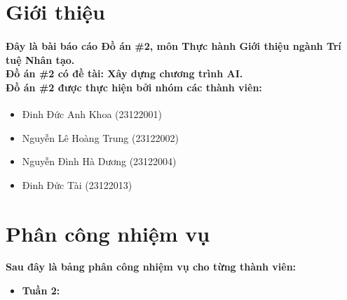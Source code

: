 \section{Giới thiệu}
\paragraph{Đây là bài báo cáo Đồ án \#2, môn Thực hành Giới thiệu ngành Trí tuệ Nhân tạo. \\Đồ án \#2 có đề tài: Xây dựng chương trình AI. \\Đồ án \#2 được thực hiện bởi nhóm các thành viên:}

\begin{itemize}
    \item Đinh Đức Anh Khoa (23122001)
    \item Nguyễn Lê Hoàng Trung (23122002)
    \item Nguyễn Đình Hà Dương (23122004)
    \item Đinh Đức Tài (23122013)
\end{itemize}

\section{Phân công nhiệm vụ}

\textbf{Sau đây là bảng phân công nhiệm vụ cho từng thành viên:}

\begin{itemize}
    \item \textbf{Tuần 2:}
\end{itemize}

